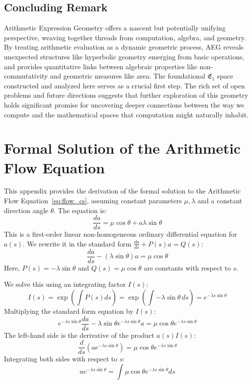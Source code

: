 \documentclass[12pt]{article}
\begin{document}
\subsection{Concluding Remark}

Arithmetic Expression Geometry offers a nascent but potentially unifying perspective, weaving together threads from computation, algebra, and geometry. By treating arithmetic evaluation as a dynamic geometric process, AEG reveals unexpected structures like hyperbolic geometry emerging from basic operations, and provides quantitative links between algebraic properties like non-commutativity and geometric measures like area. The foundational \( \mathfrak{E}_1 \) space constructed and analyzed here serves as a crucial first step. The rich set of open problems and future directions suggests that further exploration of this geometry holds significant promise for uncovering deeper connections between the way we compute and the mathematical spaces that computation might naturally inhabit.

\newpage %
\appendix %

\section{Formal Solution of the Arithmetic Flow Equation} %
\label{app:flow_solution}

This appendix provides the derivation of the formal solution to the Arithmetic Flow Equation~\eqref{eq:flow_cs}, assuming constant parameters \( \mu, \lambda \) and a constant direction angle \( \theta \). The equation is:
\[
\frac{da}{ds} = \mu \cos \theta + a \lambda \sin \theta
\]
This is a first-order linear non-homogeneous ordinary differential equation for \( a(s) \). We rewrite it in the standard form \( \frac{da}{ds} + P(s) a = Q(s) \):
\[
\frac{da}{ds} - (\lambda \sin \theta) a = \mu \cos \theta
\]
Here, \( P(s) = -\lambda \sin \theta \) and \( Q(s) = \mu \cos \theta \) are constants with respect to \( s \).

We solve this using an integrating factor \( I(s) \):
\[
I(s) = \exp\left( \int P(s) ds \right) = \exp\left( \int -\lambda \sin \theta \, ds \right) = e^{-\lambda s \sin \theta}
\]
Multiplying the standard form equation by \( I(s) \):
\[
e^{-\lambda s \sin \theta} \frac{da}{ds} - \lambda \sin \theta e^{-\lambda s \sin \theta} a = \mu \cos \theta e^{-\lambda s \sin \theta}
\]
The left-hand side is the derivative of the product \( a(s) I(s) \):
\[
\frac{d}{ds}\left( a e^{-\lambda s \sin \theta} \right) = \mu \cos \theta e^{-\lambda s \sin \theta}
\]
Integrating both sides with respect to \( s \):
\[
a e^{-\lambda s \sin \theta} = \int \mu \cos \theta e^{-\lambda s \sin \theta} ds
\]
\end{document}
